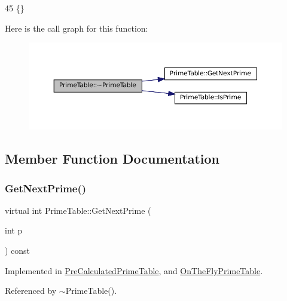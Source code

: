 \begin{DoxyCode}
45 \{\}
\end{DoxyCode}
Here is the call graph for this function\+:
\nopagebreak
\begin{figure}[H]
\begin{center}
\leavevmode
\includegraphics[width=350pt]{classPrimeTable_af2cdea4896fd86a42b4dfd5e5027d640_cgraph}
\end{center}
\end{figure}


\subsection{Member Function Documentation}
\mbox{\label{classPrimeTable_ae537c939f56617d8937d57bbbae3ab30}} 
\subsubsection{\texorpdfstring{Get\+Next\+Prime()}{GetNextPrime()}}
{\footnotesize\ttfamily virtual int Prime\+Table\+::\+Get\+Next\+Prime (\begin{DoxyParamCaption}\item[{int}]{p }\end{DoxyParamCaption}) const\hspace{0.3cm}{\ttfamily [pure virtual]}}



Implemented in \hyperlink{classPreCalculatedPrimeTable_a0ff10b1fe13df7e56b8d7ed9f41d3998}{Pre\+Calculated\+Prime\+Table}, and \hyperlink{classOnTheFlyPrimeTable_a5a4644fedd95d33136723f33b9302bfc}{On\+The\+Fly\+Prime\+Table}.



Referenced by $\sim$\+Prime\+Table().

